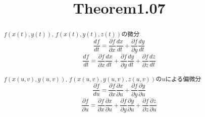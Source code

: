 \documentclass{jsarticle}
\title{Theorem1.07}
\begin{document}
\maketitle

\begin{abstract}
  $f(x(t), y(t))$, $f(x(t), y(t), z(t))$の微分
  \begin{equation}
    \frac{df}{dt} = \frac{\partial f}{\partial x}\frac{dx}{dt} 
    + \frac{\partial f}{\partial y}\frac{dy}{dt}
  \end{equation}
  \begin{equation}
    \frac{df}{dt} = \frac{\partial f}{\partial x}\frac{dx}{dt} 
    + \frac{\partial f}{\partial y}\frac{dy}{dt}
    + \frac{\partial f}{\partial z}\frac{dz}{dt}
  \end{equation}

  $f(x(u, v), y(u, v))$, $f(x(u, v), y(u, v), z(u, v))$の$u$による偏微分
   \begin{equation}
    \frac{\partial f}{du} = \frac{\partial f}{\partial x}\frac{\partial x}{\partial u} 
    + \frac{\partial f}{\partial y}\frac{\partial y}{\partial u}
  \end{equation}
  \begin{equation}
    \frac{\partial f}{\partial u} = \frac{\partial f}{\partial x}\frac{\partial x}{\partial u} 
    + \frac{\partial f}{\partial y}\frac{\partial y}{\partial u}
    + \frac{\partial f}{\partial z}\frac{\partial z}{\partial u}
  \end{equation}
\end{abstract}
\end{document}
